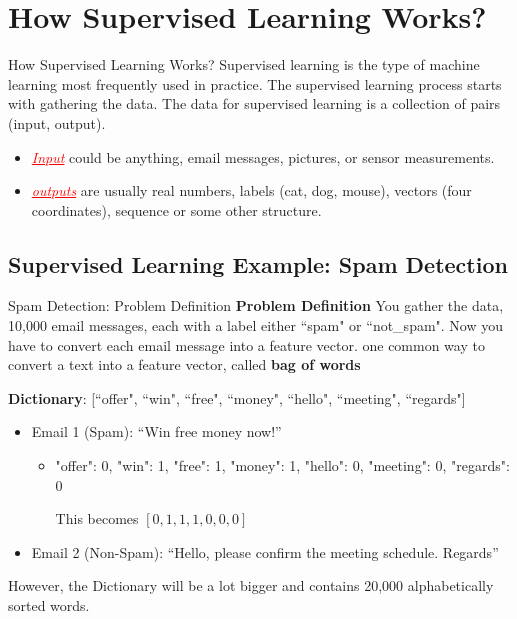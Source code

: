 \documentclass[10pt,dvipsnames]{beamer}
\newcommand{\cb}[1]{{\color{CadetBlue}#1}}
\begin{document}
\section{How Supervised Learning Works?}
\begin{frame}{How Supervised Learning Works?}
    Supervised learning is the type of machine learning most frequently used in practice. The supervised learning process starts with gathering the data. The data for supervised learning is a collection of pairs (input, output).
    \begin{itemize}
        \item \textcolor{red}{\underline{\textit{Input}}} could be anything, email messages, pictures, or sensor measurements.
        \item \textcolor{red}{\underline{\textit{outputs}}} are usually real numbers, labels (cat, dog, mouse), vectors (four coordinates), sequence or some other structure.
    \end{itemize}
\end{frame}

\subsection{Supervised Learning Example: Spam Detection}
\begin{frame}{Spam Detection: Problem Definition}
    \cb{\textbf{Problem Definition}} You gather the data, 10,000 email messages, each with a label either ``spam" or ``not\_spam". Now you have to convert each email message into a feature vector. one common way to convert a text into a feature vector, called \textbf{bag of words}
    \begin{tcolorbox}[enhanced jigsaw, breakable, pad at break*=1mm, colback=gray!20!white, colframe=black!85!black, title=\textbf{Bag of Words}]
        \textbf{Dictionary}: [``offer", ``win", ``free", ``money", ``hello", ``meeting", ``regards"]
        \begin{itemize}
            \item Email 1 (Spam): ``Win free money now!''
                  \begin{itemize}
                      \item "offer": 0, "win": 1, "free": 1, "money": 1, "hello": 0, "meeting": 0, "regards": 0

                            This becomes \([0,1,1,1,0,0,0]\)
                  \end{itemize}
            \item Email 2 (Non-Spam): ``Hello, please confirm the meeting schedule. Regards''
        \end{itemize}
    \end{tcolorbox}
    However, the Dictionary will be a lot bigger and contains 20,000 alphabetically sorted words.
\end{frame}
\end{document}
